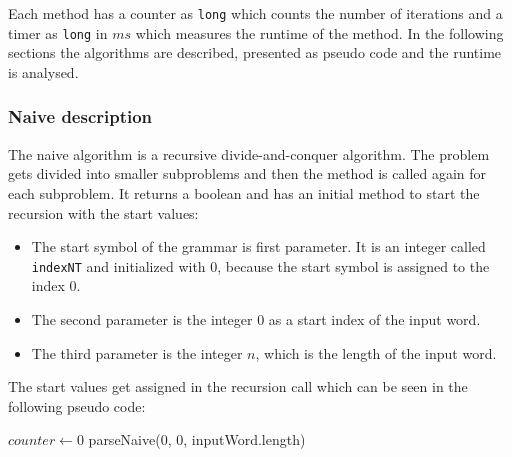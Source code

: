 \documentclass[a4paper, 11pt]{article}
\begin{document}
Each method has a counter as \texttt{long} which counts the number of iterations and a timer as \texttt{long} in $ms$ which measures the runtime of the method. In the following sections the algorithms are described, presented as pseudo code and the runtime is analysed.


\subsubsection{Naive description}
\label{naivedescription}


The naive algorithm is a recursive divide-and-conquer algorithm. The problem gets divided into smaller subproblems and then the method is called again for each subproblem. It returns a boolean and has an initial method to start the recursion with the start values:
\begin{itemize}
\item The start symbol of the grammar is first parameter. It is an integer called \texttt{indexNT} and initialized with 0, because the start symbol is assigned to the index 0.
\item The second parameter is the integer 0 as a start index of the input word.
\item The third parameter is the integer $n$, which is the length of the input word.
\end{itemize} 


The start values get assigned in the recursion call which can be seen in the following pseudo code:
 
\begin{center}
\label{alg:cap}
\label{alg_naive_rec_call}
\begin{algorithmic}[1]
\State $counter \gets 0$
\State \Return parseNaive(0, 0, inputWord.length)
\end{algorithmic}
\hrulefill
\end{center}
\end{document}
